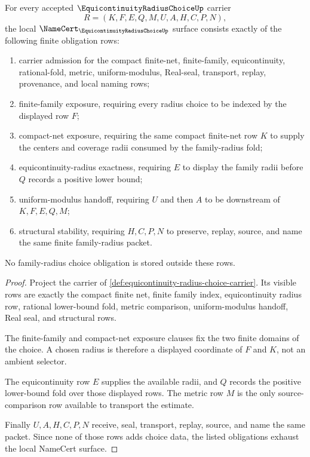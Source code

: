 \begin{theorem}
\label{thm:equicontinuity-radius-choice-namecert-obligations}
For every accepted $\EquicontinuityRadiusChoiceUp$ carrier
$$
R=(K,F,E,Q,M,U,A,H,C,P,N),
$$
the local $\NameCert_{\EquicontinuityRadiusChoiceUp}$ surface consists exactly of the following finite obligation rows:
\begin{enumerate}
\item carrier admission for the compact finite-net, finite-family, equicontinuity, rational-fold, metric, uniform-modulus, Real-seal, transport, replay, provenance, and local naming rows;
\item finite-family exposure, requiring every radius choice to be indexed by the displayed row $F$;
\item compact-net exposure, requiring the same compact finite-net row $K$ to supply the centers and coverage radii consumed by the family-radius fold;
\item equicontinuity-radius exactness, requiring $E$ to display the family radii before $Q$ records a positive lower bound;
\item uniform-modulus handoff, requiring $U$ and then $A$ to be downstream of $K,F,E,Q,M$;
\item structural stability, requiring $H,C,P,N$ to preserve, replay, source, and name the same finite family-radius packet.
\end{enumerate}
No family-radius choice obligation is stored outside these rows.
\end{theorem}
\begin{proof}
Project the carrier of \autoref{def:equicontinuity-radius-choice-carrier}. Its visible rows are exactly the compact finite net, finite family index, equicontinuity radius row, rational lower-bound fold, metric comparison, uniform-modulus handoff, Real seal, and structural rows.

The finite-family and compact-net exposure clauses fix the two finite domains of the choice. A chosen radius is therefore a displayed coordinate of $F$ and $K$, not an ambient selector.

The equicontinuity row $E$ supplies the available radii, and $Q$ records the positive lower-bound fold over those displayed rows. The metric row $M$ is the only source-comparison row available to transport the estimate.

Finally $U,A,H,C,P,N$ receive, seal, transport, replay, source, and name the same packet. Since none of those rows adds choice data, the listed obligations exhaust the local NameCert surface.
\end{proof}

